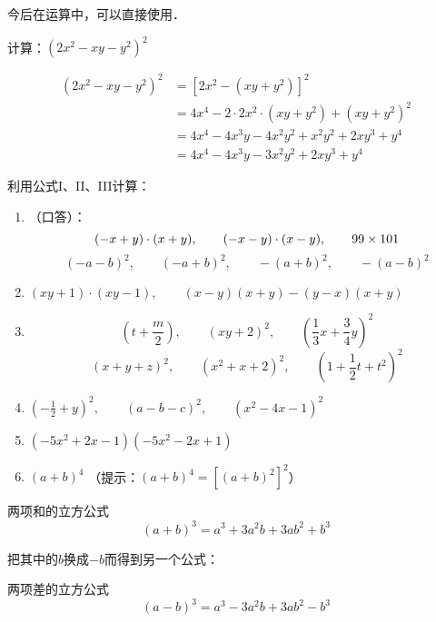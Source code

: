 今后在运算中，可以直接使用．

\begin{example}
    计算：$(2x^2-xy-y^2)^2$
\end{example}

\begin{solution}
    \[\begin{split}
(2x^2-xy-y^2)^2 &= [2x^2-(xy+y^2)]^2\\
&=4x^4-2\cdot 2x^2\cdot (xy+y^2)+  (xy+y^2)^2\\
&=     4x^4-4x^3y-4x^2y^2+x^2y^2+2xy^3+y^4\\ 
&=       4x^4-4x^3y-3x^2y^2+2xy^3+y^4
    \end{split}\]
\end{solution}

\begin{ex}
    利用公式I、II、III计算：
\begin{enumerate}
    \item （口答）：
    \[(-x+y)\cdot (x+y), \qquad (-x-y)\cdot (x-y),\qquad 99\times 101\]
    \[(-a-b)^2,\qquad (-a+b)^2,\qquad -(a+b)^2,\qquad -(a-b)^2 \]

    \item $(xy+1)\cdot (xy-1),\qquad (x-y)(x+y)-(y-x)(x+y)$
    \item \[\left(t+\frac{m}{2}\right),\qquad (xy+2)^2,\qquad \left(\frac{1}{3}x+\frac{3}{4}y\right)^2\]
     \[(x+y+z)^2,\qquad (x^2+x+2)^2,\qquad \left(1+\frac{1}{2}t+t^2\right)^2\]
\item $\left(-\frac{1}{2}+y\right)^2,\qquad (a-b-c)^2,\qquad (x^2-4x-1)^2$
\item $(-5x^2+2x-1)(-5x^2-2x+1)$
\item $(a+b)^4$  （提示：$(a+b)^4=[(a+b)^2]^2$）
    \end{enumerate}
\end{ex}

\begin{blk}{两项和的立方公式}
    \begin{equation*}
        (a+b)^3=a^3+3a^2b+3ab^2+b^3 \tag{IV}
    \end{equation*}
\end{blk}

把其中的$b$换成$-b$而得到另一个公式：

\begin{blk}{两项差的立方公式}
    \begin{equation*}
        (a-b)^3=a^3-3a^2b+3ab^2-b^3 \tag{V}  
    \end{equation*}
\end{blk}

